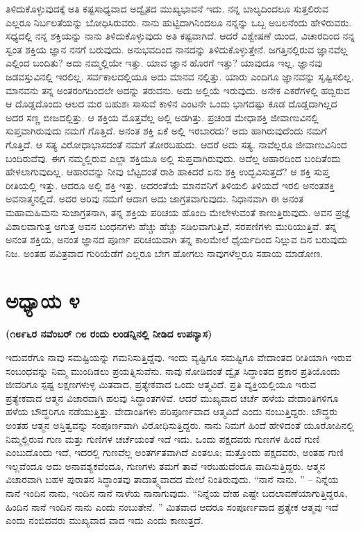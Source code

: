 ತಿಳಿದುಕೊಳ್ಳುವುದಕ್ಕೆ ಅತಿ ಕಷ್ಟಸಾಧ್ಯವಾದ ಅದ್ವೈತದ ಮುಖ್ಯಭಾವನೆ ಇದು. ನನ್ನ ಬಾಲ್ಯದಿಂದಲೂ ಸುತ್ತಲಿರುವ ಎಲ್ಲರೂ ನಿರ್ಬಲತೆಯನ್ನು ಬೋಧಿಸಿರುವರು. ನಾನು ಹುಟ್ಟಿದಾಗಿನಿಂದಲೂ ನನ್ನನ್ನು ಒಬ್ಬ ಅಬಲನೆಂದು ಹೇಳಿರುವರು. ಸಧ್ಯದಲ್ಲಿ ನನ್ನ ಶಕ್ತಿಯನ್ನು ನಾನು ತಿಳಿದುಕೊಳ್ಳುವುದು ಅತಿ ಕಷ್ಟವಾಗಿದೆ. ಆದರೆ ವಿಶ್ವೇಷಣೆ ಯಿಂದ, ವಿಚಾರದಿಂದ ನನ್ನ ಸ್ವಂತ ಶಕ್ತಿಯ ಜ್ಞಾನ ನನಗೆ ಬರುವುದು. ಅನುಭವದಿಂದ ನಾನದನ್ನು ತಿಳಿದುಕೊಳ್ಳುತ್ತೇನೆ. ಜಗತ್ತಿನಲ್ಲಿರುವ ಜ್ಞಾನವೆಲ್ಲ ಎಲ್ಲಿಂದ ಬಂದಿತು? ಅದು ನಮ್ಮಲ್ಲಿಯೇ ಇತ್ತು. ಯಾವ ಜ್ಞಾನ ಹೊರಗೆ ಇತ್ತು? ಯಾವುದೂ ಇಲ್ಲ. ಜ್ಞಾನವು ಜಡವಸ್ತುವಿನಲ್ಲಿ ಇರಲಿಲ್ಲ. ಸರ್ವಕಾಲದಲ್ಲಿಯೂ ಅದು ಮಾನವ ನಲ್ಲಿತ್ತು. ಯಾರು ಎಂದಿಗೂ ಜ್ಞಾನವನ್ನು ಸೃಷ್ಟಿಸಲಿಲ್ಲ. ಮಾನವನು ತನ್ನ ಅಂತರಂಗದಿಂದಲೇ ಅದನ್ನು ತರುವನು. ಅದು ಅಲ್ಲಿಯೆ ಇರುವುದು. ಅನೇಕ ಎಕರೆಗಳಲ್ಲಿ ಹಬ್ಬಿರುವ ಆ ದೊಡ್ಡದೊಂದು ಆಲದ ಮರ ಬಹುಶಃ ಸಾಸುವೆ ಕಾಳಿನ ಎಂಟನೇ ಒಂದು ಭಾಗದಷ್ಟು ಕೂಡ ದೊಡ್ಡದಾಗಿಲ್ಲದ ಅದರ ಸಣ್ಣ ಬೀಜದಲ್ಲಿತ್ತು. ಆ ಶಕ್ತಿಯ ಮೊತ್ತವೆಲ್ಲ ಅಲ್ಲಿ ಅಡಗಿತ್ತು. ಪ್ರಚಂಡ ಮೇಧಾಶಕ್ತಿ ಜೀವಾಣುವಿನಲ್ಲಿ ಸುಪ್ತವಾಗಿರುವುದು ನಮಗೆ ಗೊತ್ತಿದೆ. ಅನಂತ ಶಕ್ತಿ ಏಕೆ ಅಲ್ಲಿ ಇರಬಾರದು? ಅದು ಹಾಗಿರುವುದೆಂದು ನಮಗೆ ಗೊತ್ತಿದೆ. ಆ ಸತ್ಯ ವಿರೋಧಾಭಾಸದಂತೆ ನಮಗೆ ತೋರಬಹುದು. ಆದರೆ ಅದು ಸತ್ಯ. ನಾವೆಲ್ಲರೂ ಜೀವಾಣುವಿನಿಂದ ಬಂದಿರುವೆವು. ಈಗ ನಮ್ಮಲ್ಲಿರುವ ಎಲ್ಲಾ ಶಕ್ತಿಯೂ ಅಲ್ಲಿ ಸುಪ್ತವಾಗಿರುವುದು. ಅದೆಲ್ಲ ಆಹಾರದಿಂದ ಬಂದಿತೆಂದು ಹೇಳಲಾಗುವುದಿಲ್ಲ. ಆಹಾರವನ್ನು ನೀವು ಬೆಟ್ಟದಂತೆ ರಾಶಿ ಹಾಕಿದರೆ ಏನು ಶಕ್ತಿ ಉದ್ಭವಿಸುತ್ತದೆ? ಆ ಶಕ್ತಿ ಸುಪ್ತ ರೀತಿಯಲ್ಲಿ ಇತ್ತು. ಆದರೂ ಅಲ್ಲಿ ಶಕ್ತಿ ಇತ್ತು. ಅದರಂತೆಯೆ ಮಾನವನಿಗೆ ತಿಳಿಯಲಿ ತಿಳಿಯದೆ ಇರಲಿ ಅನಂತಶಕ್ತಿ ಅವನಾತ್ಮನಲ್ಲಿದೆ. ಅದರ ಅರಿವು ನಮಗೆ ಆದಾಗ ಅದು ಜಾಗ್ರತವಾಗುವುದು. ನಿಧಾನವಾಗಿ ಈ ಅನಂತ ಮಹಾಮಹಿಮನು ಸುಜಾಗ್ರತನಾಗಿ, ತನ್ನ ಶಕ್ತಿಯ ಪರಿಚಯ ಹೊಂದಿ ಮೇಲೇಳುವಂತೆ ಕಾಣುತ್ತಿರುವುದು. ಅವನ ಪ್ರಜ್ಞೆ ವಿಶಾಲವಾಗುತ್ತ ಆಗುತ್ತ ಅವನ ಬಂಧನಗಳು ಹೆಚ್ಚು ಹೆಚ್ಚು ಸಡಿಲವಾಗುತ್ತಿವೆ, ಸರಪಣಿಗಳು ಮುರಿಯುತ್ತಿವೆ. ತನ್ನ ಅನಂತ ಶಕ್ತಿಯ, ಅನಂತ ಜ್ಞಾನದ ಪೂರ್ಣ ಪರಿಚಯವಾಗಿ ತನ್ನ ಕಾಲಮೇಲೆ ಧೈರ್ಯದಿಂದ ನಿಲ್ಲುವ ದಿನ ಬರುವುದು ನಿಜ. ಅಂತಹ ಪವಿತ್ರವಾದ ಗುರಿಯೆಡೆಗೆ ಎಲ್ಲರೂ ಬೇಗ ಹೋಗಲು ನಾವುಗಳೆಲ್ಲರೂ ಸಹಾಯ ಮಾಡೋಣ.

\chapter{ಅಧ್ಯಾಯ ೪}

\begin{center}
\textbf{(೧೮೯೬ರ ನವೆಂಬರ್​ ೧೮ ರಂದು ಲಂಡನ್ನಿನಲ್ಲಿ ನೀಡಿದ ಉಪನ್ಯಾಸ)}
\end{center}

ಇದುವರೆಗೂ ನಾವು ಸಮಷ್ಟಿಯನ್ನು ಗಮನಿಸುತ್ತಿದ್ದೆವು. ಇಂದು ವ್ಯಷ್ಟಿಗೂ ಸಮಷ್ಟಿಗೂ ವೇದಾಂತದ ರೀತಿಯಾಗಿ ಇರುವ ಸಂಬಂಧವನ್ನು ನಿಮ್ಮ ಮುಂದಿಡಲು ಪ್ರಯತ್ನಿಸುವೆನು. ನಾವು ನೋಡಿದಂತೆ ದ್ವೈತ ಸಿದ್ಧಾಂತದ ಪ್ರಕಾರ ಪ್ರತಿಯೊಂದು ಜೀವರಿಗೂ ಸ್ಪಷ್ಟ ಲಕ್ಷಣಗಳುಳ್ಳ ಮಿತವಾದ, ಪ್ರತ್ಯೇಕವಾದ ಒಂದು ಆತ್ಮವಿದೆ. ಪ್ರತಿ ವ್ಯಕ್ತಿಯಲ್ಲಿಯೂ ಇರುವ ಪ್ರತ್ಯೇಕವಾದ ಆತ್ಮನ ವಿಚಾರವಾಗಿ ಹಲವು ಸಿದ್ಧಾಂತಗಳಿವೆ. ಆದರೆ ಮುಖ್ಯವಾದ ಚರ್ಚೆ ಹಳೆಯ ವೇದಾಂತಿಗಳಿಗೂ ಹಳೆಯ ಬೌದ್ಧರಿಗೂ ನಡೆಯುತ್ತಿತ್ತು. ವೇದಾಂತಿಗಳು ಪರಿಪೂರ್ಣವಾದ ಆತ್ಮವಿದೆ ಎಂದು ನಂಬುತ್ತಿದ್ದರು. ಬೌದ್ಧರು ಅಂತಹ ಆತ್ಮನ ಅಸ್ತಿತ್ವವನ್ನು ಸಂಪೂರ್ಣವಾಗಿ ವಿರೋಧಿಸುತ್ತಿದ್ದರು. ನಾನು ನಿಮಗೆ ಹಿಂದೆ ಹೇಳಿದಂತೆ ಯೂರೋಪಿನಲ್ಲಿ ನಿಮ್ಮಲ್ಲಿರುವ ಗುಣ ಮತ್ತು ಗುಣಿಗಳ ಚರ್ಚೆಯಂತೆ ಇದೆ ಇದು. ಒಂದು ಪಕ್ಷದವರು ಗುಣಗಳ ಹಿಂದೆ ಗುಣಿ ಎಂಬುದೊಂದು ಇದೆ, ಇದರಲ್ಲಿ ಗುಣವೆಲ್ಲ ಅಂತರ್ಗತವಾಗಿದೆ ಎಂತಲೂ; ಮತ್ತೊಂದು ಪಕ್ಷದವರು, ಅಂತಹ ಗುಣಿ ಇಲ್ಲವೆಂದೂ ಅದು ಅನಾವಶ್ಯಕವೆಂದೂ, ಗುಣಗಳು ತಮಗೆ ತಾವೆ ಇರಬಹುದೆಂದೂ ವಾದಿಸುತ್ತಿದ್ದರು. ಆತ್ಮನ ವಿಚಾರವಾಗಿ ಬಹಳ ಪುರಾತನ ಸಿದ್ಧಾಂತವು ತಾದಾತ್ಮ್ಯವಾದದ ಮೇಲೆ ನಿಂತಿರುವುದು. “ನಾನೆ ನಾನು. ” – ನಿನ್ನೆಯ ನಾನೆ ಇಂದಿನ ನಾನು, ಇಂದಿನ ನಾನೆ ನಾಳೆಯ ನಾನಾಗುವುದು. “ನಿನ್ನೆಯ ದೇಹ ಎಷ್ಟೇ ಬದಲಾವಣೆಯಾಗುತ್ತಿದ್ದರೂ, ಹಿಂದಿನ ನಾನೆ ಇಂದಿನ ನಾನು ಎಂದು ನಂಬುತೇನೆ. ” ಮಿತವಾದ ಆದರೂ ಸಂಪೂರ್ಣವಾದ ಪ್ರತ್ಯೇಕ ಆತ್ಮವು ಇದೆ ಎಂದು ನಂಬಿದವರು ಮುಖ್ಯವಾದ ವಾದ ಇದು ಎಂದು ಕಾಣುತ್ತದೆ. 

